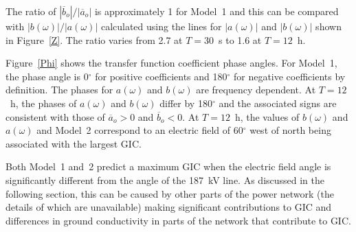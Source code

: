 \documentclass[draft,linenumbers]{agujournal2018}
\begin{document}
The ratio of $|\overline{b}_o|/|\overline{a}_o|$ is approximately 1 for Model~1 and this can be compared with $|b(\omega)|/|a(\omega)|$ calculated using the lines for $|a(\omega)|$ and $|b(\omega)|$ shown in Figure~\ref{Z}. The ratio varies from 2.7 at $T=30$~s to 1.6 at $T=12$~h. 

Figure~\ref{Phi} shows the transfer function coefficient phase angles. For Model~1, the phase angle is 0$^{\circ}$ for positive coefficients and 180$^{\circ}$ for negative coefficients by definition. The phases for $a(\omega)$ and $b(\omega)$ are frequency dependent. At $T=12$~h, the phases of $a(\omega)$ and $b(\omega)$ differ by 180$^{\circ}$ and the associated signs are consistent with those of $\overline{a}_o > 0$ and $\overline{b}_o < 0$. At $T=12$~h, the values of $b(\omega)$ and $a(\omega)$ and Model~2 correspond to an electric field of 60$^{\circ}$ west of north being associated with the largest GIC.

Both Model~1 and~2 predict a maximum GIC when the electric field angle is significantly different from the angle of the 187~kV line. As discussed in the following section, this can be caused by other parts of the power network (the details of which are unavailable) making significant contributions to GIC and differences in ground conductivity in parts of the network that contribute to GIC. 
\end{document}
